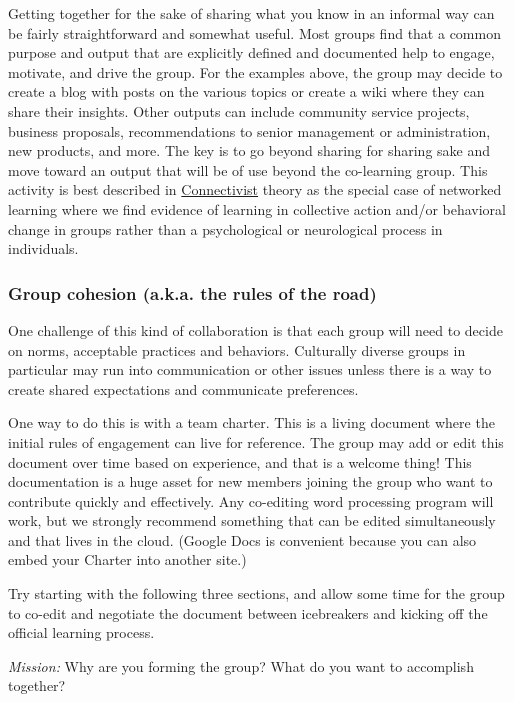 Getting together for the sake of sharing what you know in an informal
way can be fairly straightforward and somewhat useful. Most groups find
that a common purpose and output that are explicitly defined and
documented help to engage, motivate, and drive the group. For the
examples above, the group may decide to create a blog with posts on the
various topics or create a wiki where they can share their insights.
Other outputs can include community service projects, business
proposals, recommendations to senior management or administration, new
products, and more. The key is to go beyond sharing for sharing sake and
move toward an output that will be of use beyond the co-learning group.
This activity is best described in
\href{http://www.elearnspace.org/Articles/connectivism.htm}{Connectivist}
theory as the special case of networked learning where we find evidence
of learning in collective action and/or behavioral change in groups
rather than a psychological or neurological process in individuals.

\subsubsection{Group cohesion (a.k.a. the rules of the road)}

One challenge of this kind of collaboration is that each group will need
to decide on norms, acceptable practices and behaviors. Culturally
diverse groups in particular may run into communication or other issues
unless there is a way to create shared expectations and communicate
preferences.

One way to do this is with a team charter. This is a living document
where the initial rules of engagement can live for reference. The group
may add or edit this document over time based on experience, and that is
a welcome thing! This documentation is a huge asset for new members
joining the group who want to contribute quickly and effectively. Any
co-editing word processing program will work, but we strongly recommend
something that can be edited simultaneously and that lives in the cloud.
(Google Docs is convenient because you can also embed your Charter into
another site.)

Try starting with the following three sections, and allow some time for
the group to co-edit and negotiate the document between icebreakers and
kicking off the official learning process.

\emph{Mission:} Why are you forming the group? What do you want to
accomplish together?


